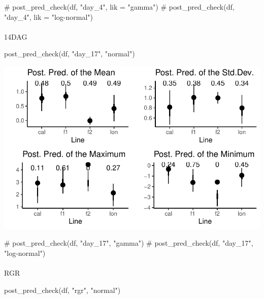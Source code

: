 \documentclass[
  letterpaper,
  DIV=11,
  numbers=noendperiod]{scrartcl}
\makeatletter
\let\oldparagraph\paragraph
\renewcommand{\paragraph}{
    \@ifstar
      \xxxParagraphStar
      \xxxParagraphNoStar
  }
\newcommand{\xxxParagraphStar}[1]{\oldparagraph*{#1}\mbox{}}
\newcommand{\xxxParagraphNoStar}[1]{\oldparagraph{#1}\mbox{}}
\newenvironment{Shaded}{\begin{snugshade}}{\end{snugshade}}
\newcommand{\CommentTok}[1]{\textcolor[rgb]{0.37,0.37,0.37}{#1}}
\newcommand{\FunctionTok}[1]{\textcolor[rgb]{0.28,0.35,0.67}{#1}}
\newcommand{\NormalTok}[1]{\textcolor[rgb]{0.00,0.23,0.31}{#1}}
\newcommand{\StringTok}[1]{\textcolor[rgb]{0.13,0.47,0.30}{#1}}
\makeatother
\begin{document}
\begin{Shaded}
\begin{Highlighting}[]
\CommentTok{\# post\_pred\_check(df, "day\_4", lik = "gamma")}
\CommentTok{\# post\_pred\_check(df, "day\_4", lik = "log{-}normal")}
\end{Highlighting}
\end{Shaded}

\paragraph{14DAG}\label{dag-1}

\begin{Shaded}
\begin{Highlighting}[]
\FunctionTok{post\_pred\_check}\NormalTok{(df, }\StringTok{"day\_17"}\NormalTok{, }\StringTok{"normal"}\NormalTok{)}
\end{Highlighting}
\end{Shaded}

\includegraphics{analysis_files/figure-pdf/unnamed-chunk-3-1.pdf}

\begin{Shaded}
\begin{Highlighting}[]
\CommentTok{\# post\_pred\_check(df, "day\_17", "gamma")}
\CommentTok{\# post\_pred\_check(df, "day\_17", "log{-}normal")}
\end{Highlighting}
\end{Shaded}

\paragraph{RGR}\label{rgr}

\begin{Shaded}
\begin{Highlighting}[]
\FunctionTok{post\_pred\_check}\NormalTok{(df, }\StringTok{"rgr"}\NormalTok{, }\StringTok{"normal"}\NormalTok{)}
\end{Highlighting}
\end{Shaded}
\end{document}
